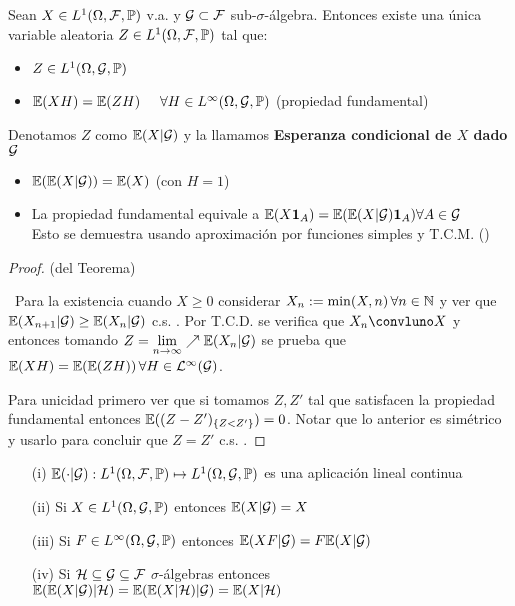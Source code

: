 \begin{theorem}
Sean $X\in L^1(\Omega,\mathcal{F},\mathbb{P})$ v.a. y $\mathcal{G}\subset\mathcal{F}$ sub-$\sigma$-álgebra. Entonces existe una única variable aleatoria $Z\in L^1(\Omega,\mathcal{F},\mathbb{P})$ tal que:
\begin{itemize}
    \item $Z\in L^1(\Omega,\mathcal{G},\mathbb{P})$
    \item $\mathbb{E}(XH)=\mathbb{E}(ZH) \hspace{.5cm} \forall H\in L^\infty(\Omega,\mathcal{G},\mathbb{P})$ \espacio (propiedad fundamental)
\end{itemize}
\end{theorem}
\begin{notation}
Denotamos $Z$  como $\mathbb{E}(X|\mathcal{G})$ y la llamamos \textbf{Esperanza condicional de $X$ %
dado $\mathcal{G}$}
\end{notation}
\begin{remark}
\beforeitemize
\begin{itemize}
    \item $\mathbb{E}(\mathbb{E}(X|\mathcal{G}))=\mathbb{E}(X)$ (con $H=1$)
    \item La propiedad fundamental equivale a $\mathbb{E}(X \mathbf{1}_A)=\mathbb{E}(\mathbb{E}(X|\mathcal{G})\mathbf{1}_A) \forall A\in\mathcal{G}$
    \\ Esto se demuestra usando aproximación por funciones simples y T.C.M. (\ejercicio)
\end{itemize}
\end{remark}
\begin{proof}
(del Teorema)

\ejercicio \gris \, Para la existencia cuando $X\geq0$ considerar $X_n:=\min(X,n) \, \forall n\in\mathbb{N}$ y ver que $\mathbb{E}(X_{n+1}|\mathcal{G})\geq\mathbb{E}(X_n|\mathcal{G})$ c.s. . Por T.C.D. se verifica que $X_n\convluno X$ y entonces tomando $Z=\displaystyle\lim_{n\to\infty}\nearrow\mathbb{E}(X_n|\mathcal{G})$ se prueba que $\mathbb{E}(XH)=\mathbb{E}(\mathbb{E}(ZH))\,\forall H\in \mathcal{L}^\infty(\mathcal{G})$. 

Para unicidad primero ver que si tomamos $Z,Z'$ tal que satisfacen la propiedad fundamental entonces $\mathbb{E}((Z-Z')_{\{Z<Z'\}})=0$. Notar que lo anterior es simétrico y usarlo para concluir que $Z=Z'$ c.s. .
\negro
\end{proof}
\begin{property}
\beforeitemize
\begin{enumerate}
    \item[(i)] $\mathbb{E}(\cdot|\mathcal{G}):L^1(\Omega,\mathcal{F},\mathbb{P})\mapsto L^1(\Omega,\mathcal{G},\mathbb{P})$ es una aplicación lineal continua
    \item[(ii)] Si $X\in L^1(\Omega,\mathcal{G},\mathbb{P})$ entonces $\mathbb{E}(X|\mathcal{G})=X$
    \item[(iii)] Si $F\in L^\infty(\Omega,\mathcal{G},\mathbb{P})$ entonces $\mathbb{E}(XF|\mathcal{G})=F\mathbb{E}(X|\mathcal{G})$
    \item[(iv)] Si $\mathcal{H}\subseteq \mathcal{G}\subseteq\mathcal{F}$ $\sigma$-álgebras entonces
    $ \mathbb{E}(\mathbb{E}(X|\mathcal{G})|\mathcal{H}) = \mathbb{E}(\mathbb{E}(X|\mathcal{H})|\mathcal{G})=\mathbb{E}(X|\mathcal{H})$
\end{enumerate}
\end{property}
